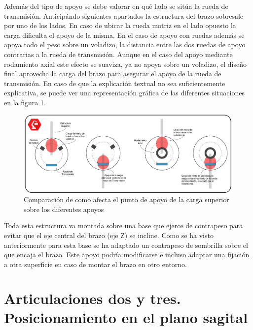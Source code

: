     Además del tipo de apoyo se debe valorar en qué lado se sitúa la rueda de transmisión. Anticipándo siguientes apartados la estructura del brazo sobresale por uno de los lados. En caso de ubicar la rueda motriz en el lado opuesto la carga dificulta el apoyo de la misma. En el caso de apoyo con ruedas además se apoya todo el peso sobre un voladizo, la distancia entre las dos ruedas de apoyo contrarias a la rueda de transmisión. Aunque en el caso del apoyo mediante rodamiento axial este efecto se suaviza, ya no apoya sobre un voladizo, el diseño final aprovecha la carga del brazo para asegurar el apoyo de la rueda de transmisión. En caso de que la explicación textual no sea suficientemente explicativa, se puede ver una representación gráfica de las diferentes situaciones en la figura \ref{fig:Mecanica:apoyo_carga}.

    \begin{figure}[H]
        \centering
        \includegraphics[width=\textwidth]{figuras/Imagenes_Mecanica/comparacion_apoyos.jpg}
        \caption{Comparación de como afecta el punto de apoyo de la carga superior sobre los diferentes apoyos}
        \label{fig:Mecanica:apoyo_carga}
    \end{figure}

    Toda esta estructura va montada sobre una base que ejerce de contrapeso para evitar que el eje central del brazo (eje Z) se incline. Como se ha visto anteriormente para esta base se ha adaptado un contrapeso de sombrilla sobre el que encaja el brazo. Este apoyo podría modificarse e incluso adaptar una fijación a otra superficie en caso de montar el brazo en otro entorno.


\section{Articulaciones dos y tres. Posicionamiento en el plano sagital} \label{sec:Mecanica:articulacion_dostres}

